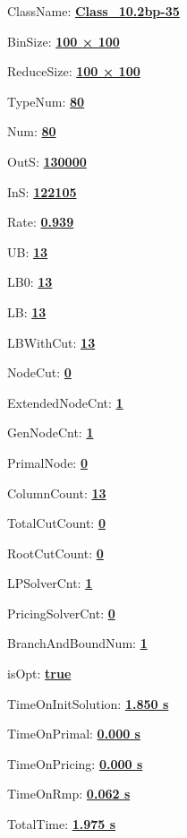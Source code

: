 \documentclass[11pt]{article}
\begin{document}
\pagestyle{empty}


ClassName: \underline{\textbf{Class_10.2bp-35}}
\par
BinSize: \underline{\textbf{100 × 100}}
\par
ReduceSize: \underline{\textbf{100 × 100}}
\par
TypeNum: \underline{\textbf{80}}
\par
Num: \underline{\textbf{80}}
\par
OutS: \underline{\textbf{130000}}
\par
InS: \underline{\textbf{122105}}
\par
Rate: \underline{\textbf{0.939}}
\par
UB: \underline{\textbf{13}}
\par
LB0: \underline{\textbf{13}}
\par
LB: \underline{\textbf{13}}
\par
LBWithCut: \underline{\textbf{13}}
\par
NodeCut: \underline{\textbf{0}}
\par
ExtendedNodeCnt: \underline{\textbf{1}}
\par
GenNodeCnt: \underline{\textbf{1}}
\par
PrimalNode: \underline{\textbf{0}}
\par
ColumnCount: \underline{\textbf{13}}
\par
TotalCutCount: \underline{\textbf{0}}
\par
RootCutCount: \underline{\textbf{0}}
\par
LPSolverCnt: \underline{\textbf{1}}
\par
PricingSolverCnt: \underline{\textbf{0}}
\par
BranchAndBoundNum: \underline{\textbf{1}}
\par
isOpt: \underline{\textbf{true}}
\par
TimeOnInitSolution: \underline{\textbf{1.850 s}}
\par
TimeOnPrimal: \underline{\textbf{0.000 s}}
\par
TimeOnPricing: \underline{\textbf{0.000 s}}
\par
TimeOnRmp: \underline{\textbf{0.062 s}}
\par
TotalTime: \underline{\textbf{1.975 s}}
\par
\newpage


\end{document}
